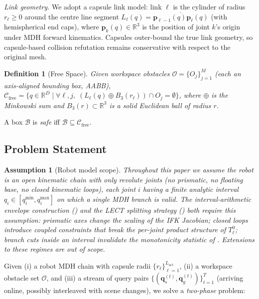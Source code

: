 \documentclass[journal]{IEEEtran}
\newtheorem{definition}{Definition}
\newtheorem{assumption}{Assumption}
\newcommand{\Real}{\mathbb{R}}
\newcommand{\Cfree}{\mathcal{C}_{\mathrm{free}}}
\newcommand{\calO}{\mathcal{O}}
\begin{document}
\emph{Link geometry.} We adopt a capsule link model: link $\ell$ is the
cylinder of radius $r_\ell \geq 0$ around the centre line segment
$L_\ell(q) = \overline{\bm{p}_{\ell-1}(q)\bm{p}_\ell(q)}$ (with hemispherical
end caps), where $\bm{p}_k(q)\in\Real^3$ is the position of joint $k$'s
origin under MDH forward kinematics. Capsules outer-bound the true link
geometry, so capsule-based collision refutation remains conservative
with respect to the original mesh.

\begin{definition}[Free Space]\label{def:cfree}
Given workspace obstacles $\calO = \{O_j\}_{j=1}^{M}$ (each an axis-aligned
bounding box, AABB),
$\Cfree = \{q \in \Real^D \mid \forall \ell, j,\;
(L_\ell(q) \oplus B_3(r_\ell)) \cap O_j = \emptyset\}$,
where $\oplus$ is the Minkowski sum and $B_3(r)\subset\Real^3$ is a
solid Euclidean ball of radius $r$.
\end{definition}

A box $\mathcal{B}$ is \emph{safe} iff $\mathcal{B} \subseteq \Cfree$.

\subsection{Problem Statement}\label{sec:problem}

\begin{assumption}[Robot model scope]\label{ass:robot_scope}
Throughout this paper we assume the robot is an open kinematic chain
with only revolute joints (no prismatic, no floating base, no closed
kinematic loops), each joint $i$ having a finite analytic interval
$q_i\!\in\![q_i^{\min},q_i^{\max}]$ on which a single MDH branch is
valid. The interval-arithmetic envelope construction
() and the LECT splitting strategy
() both require this assumption: prismatic axes change
the scaling of the IFK Jacobian; closed loops introduce coupled
constraints that break the per-joint product structure of $T_\ell^0$;
branch cuts inside an interval invalidate the monotonicity statistic of
. Extensions to these regimes are out of scope.
\end{assumption}

Given (i) a robot MDH chain with capsule radii
$\{r_\ell\}_{\ell=1}^{L_\text{act}}$, (ii) a workspace obstacle set
$\calO$, and (iii) a stream of query pairs
$\{(\bm{q}_s^{(t)},\bm{q}_g^{(t)})\}_{t=1}^{T}$ (arriving online,
possibly interleaved with scene changes), we solve a \emph{two-phase}
problem:
\end{document}
